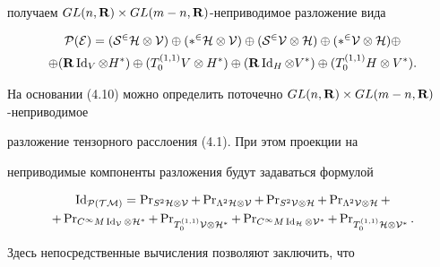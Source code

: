 получаем $GL(n,\bold R)\times GL(m-n,\bold R)$-неприводимое разложение вида 


\begin{multline} 


\cal P(E)=(S^2H\otimes V)\oplus(\Lambda^2H\otimes V)\oplus 


(S^2V\otimes H)\oplus(\Lambda^2V\otimes H)\oplus \\ 


\oplus(\bold R\Id_V\otimes H^*)\oplus(T^{(1,1)}_0V\otimes H^*)\oplus 


(\bold R\Id_H\otimes V^*)\oplus(T^{(1,1)}_0H\otimes V^*). 


\end{multline} 


На основании (4.10) можно определить поточечно $GL(n,\bold R)\times GL(m-n,\bold R)$-неприводимое 


разложение тензорного расслоения (4.1). При этом проекции на 


неприводимые компоненты разложения будут задаваться формулой


\begin{multline*}


\Id_{\cal P(TM)}=\pr_{S^2\cal H\otimes\cal V}+ 


\pr_{\Lambda^2\cal H\otimes\cal V}+\pr_{S^2\cal V\otimes\cal H}+ 


\pr_{\Lambda^2\cal V\otimes\cal H}+ \\


+\pr_{C^\infty M\Id_{\cal V}\otimes\cal H^*}+ 


\pr_{T^{(1,1)}_0\cal V\otimes\cal H^*}+ 


\pr_{C^\infty M\Id_{\cal H}\otimes\cal V^*}+ 


\pr_{T^{(1,1)}_0\cal H\otimes\cal V^*}. 


\end{multline*}


Здесь непосредственные вычисления позволяют заключить, что 


